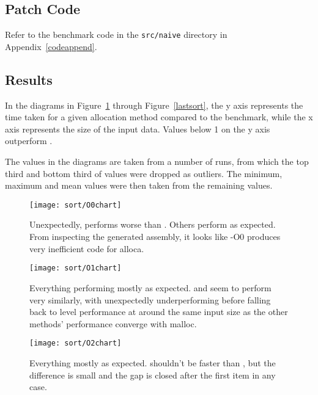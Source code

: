 \subsection{Patch Code}

Refer to the benchmark code in the \texttt{src/naive} directory in Appendix~\ref{codeappend}.

\subsection{Results}

In the diagrams in Figure~\ref{firstsort} through Figure~\ref{lastsort}, the y axis represents the time taken for a given allocation method compared to the  benchmark, while the x axis represents the size of the input data. Values below 1 on the y axis outperform \malloc{}.

The values in the diagrams are taken from a number of runs, from which the top third and bottom third of values were dropped as outliers. The minimum, maximum and mean values were then taken from the remaining values.

\begin{figure}[ph]
	\centering
	\texttt{[image: sort/O0chart]}
	\caption{Unexpectedly,  performs worse than . Others perform as expected. From inspecting the generated assembly, it looks like -O0 produces very inefficient code for alloca.}\label{firstsort}
\end{figure}

\begin{figure}[ph]
	\centering
	\texttt{[image: sort/O1chart]}
	\caption{Everything performing mostly as expected.  and  seem to perform very similarly, with  unexpectedly underperforming  before falling back to  level performance at around the same input size as the other methods' performance converge with malloc.}
\end{figure}

\begin{figure}[ph]
	\centering
	\texttt{[image: sort/O2chart]}
	\caption{Everything mostly as expected.  shouldn't be faster than , but the difference is small and the gap is closed after the first item in any case.}
\end{figure}

